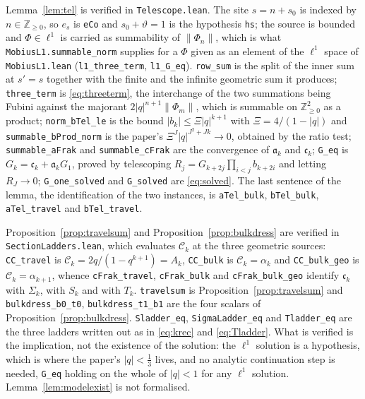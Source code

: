 \documentclass[11pt]{article}
\theoremstyle{plain}
\theoremstyle{definition}
\theoremstyle{remark}
\newcommand{\Z}{\mathbb{Z}}
\begin{document}
Lemma~\ref{lem:tel} is verified in \texttt{Telescope.lean}. The site $s=n+s_0$ is indexed by
$n\in\Z_{\ge0}$, so $e_s$ is \texttt{eCo} and $s_0+\vartheta=1$ is the hypothesis \texttt{hs}; the source
is bounded and $\Phi\in\ell^1$ is carried as summability of $\|\Phi_n\|$, which is what
\texttt{MobiusL1.summable\_norm} supplies for a $\Phi$ given as an element of the $\ell^1$ space of
\texttt{MobiusL1.lean} (\texttt{l1\_three\_term}, \texttt{l1\_G\_eq}). \texttt{row\_sum} is the
split of the inner sum at $s'=s$ together with the finite and the infinite geometric sum it
produces; \texttt{three\_term} is \eqref{eq:threeterm}, the interchange of the two summations being
Fubini against the majorant $2|q|^{n+1}\|\Phi_m\|$, which is summable on $\Z_{\ge0}^2$ as a product;
\texttt{norm\_bTel\_le} is the bound $|b_k|\le\Xi|q|^{k+1}$ with $\Xi=4/(1-|q|)$ and
\texttt{summable\_bProd\_norm} is the paper's $\Xi^J|q|^{J^2+Jk}\to0$, obtained by the ratio test;
\texttt{summable\_aFrak} and \texttt{summable\_cFrak} are the convergence of $\mathfrak a_k$ and
$\mathfrak c_k$; \texttt{G\_eq} is $G_k=\mathfrak c_k+\mathfrak a_kG_1$, proved by telescoping
$R_j=G_{k+2j}\prod_{i<j}b_{k+2i}$ and letting $R_J\to0$; \texttt{G\_one\_solved} and
\texttt{G\_solved} are \eqref{eq:solved}. The last sentence of the lemma, the identification of the
two instances, is \texttt{aTel\_bulk}, \texttt{bTel\_bulk}, \texttt{aTel\_travel} and
\texttt{bTel\_travel}.

Proposition~\ref{prop:travelsum} and Proposition~\ref{prop:bulkdress} are verified in
\texttt{SectionLadders.lean}, which evaluates $\mathcal C_k$ at the three geometric sources:
\texttt{CC\_travel} is $\mathcal C_k=2q/(1-q^{k+1})=A_k$, \texttt{CC\_bulk} is
$\mathcal C_k=\alpha_k$ and \texttt{CC\_bulk\_geo} is $\mathcal C_k=\alpha_{k+1}$, whence
\texttt{cFrak\_travel}, \texttt{cFrak\_bulk} and \texttt{cFrak\_bulk\_geo} identify $\mathfrak c_k$
with $\Sigma_k$, with $S_k$ and with $T_k$. \texttt{travelsum} is
Proposition~\ref{prop:travelsum} and \texttt{bulkdress\_b0\_t0}, \texttt{bulkdress\_t1\_b1} are the
four scalars of Proposition~\ref{prop:bulkdress}. \texttt{Sladder\_eq}, \texttt{SigmaLadder\_eq}
and \texttt{Tladder\_eq} are the three ladders written out as in \eqref{eq:krec} and
\eqref{eq:Tladder}. What is verified is the implication, not the existence of the solution: the
$\ell^1$ solution is a hypothesis, which is where the paper's $|q|<\tfrac13$ lives, and no analytic
continuation step is needed, \texttt{G\_eq} holding on the whole of $|q|<1$ for any $\ell^1$
solution. Lemma~\ref{lem:modelexist} is not formalised.
\end{document}
